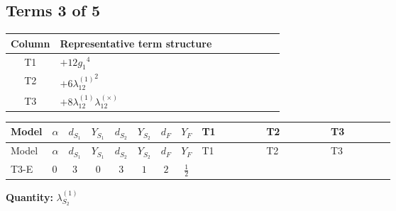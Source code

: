 \documentclass[8pt]{article}
\begin{document}
\begin{landscape}
\subsection*{Terms 3 of 5}
\begin{center}
\begin{tabular}{@{}c >{\raggedright\arraybackslash}p{0.82\linewidth}@{}}
\toprule
Column & Representative term structure \\
\midrule
T1 & \(\displaystyle +12 {g_1}^4\) \\
\midrule
T2 & \(\displaystyle +6 {\lambda_{12}^{(1)}}^2\) \\
\midrule
T3 & \(\displaystyle +8 {\lambda_{12}^{(1)}} {\lambda_{12}^{(\times)}}\) \\
\midrule
\bottomrule
\end{tabular}
\end{center}
\smallskip
\tiny
\begin{longtable}{@{}llcccccc >{\raggedright\arraybackslash}p{0.21\linewidth} >{\raggedright\arraybackslash}p{0.21\linewidth} >{\raggedright\arraybackslash}p{0.21\linewidth}@{}}
\toprule
Model & $\alpha$ & $d_{S_1}$ & $Y_{S_1}$ & $d_{S_2}$ & $Y_{S_2}$ & $d_F$ & $Y_F$ & T1 & T2 & T3 \\
\midrule
\endfirsthead
\toprule
Model & $\alpha$ & $d_{S_1}$ & $Y_{S_1}$ & $d_{S_2}$ & $Y_{S_2}$ & $d_F$ & $Y_F$ & T1 & T2 & T3 \\
\midrule
\endhead
T3-E & $0$ & $3$ & $0$ & $3$ & $1$ & $2$ & $\frac{1}{2}$ & \scriptsize\adjustbox{max width=\linewidth}{$\begin{gathered} +12 {g_1}^4\end{gathered}$} & \scriptsize\adjustbox{max width=\linewidth}{$\begin{gathered} +6 {\lambda_{12}^{(1)}}^2\end{gathered}$} & \scriptsize\adjustbox{max width=\linewidth}{$\begin{gathered} +8 {\lambda_{12}^{(1)}} {\lambda_{12}^{(\times)}}\end{gathered}$} \\
\midrule
\bottomrule
\end{longtable}
\clearpage
\noindent\textbf{Quantity: }$\lambda_{S_2}^{(1)}$\par\smallskip

\end{landscape}
\end{document}
